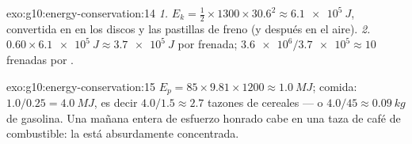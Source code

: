 \begin{solution}{exo:g10:energy-conservation:14}
\emph{1.} $E_k = \tfrac12 \times 1300 \times 30.6^2 \approx
\qty{6.1e5}{J}$, convertida en  en los discos y las
pastillas de freno (y después en el aire).
\emph{2.} $0.60 \times \qty{6.1e5}{J} \approx \qty{3.7e5}{J}$ por
frenada; $\num{3.6e6}/\num{3.7e5} \approx 10$ frenadas por
.
\end{solution}

\begin{solution}{exo:g10:energy-conservation:15}
$E_p = 85 \times 9.81 \times 1200 \approx \qty{1.0}{MJ}$; comida:
$1.0/0.25 = \qty{4.0}{MJ}$, es decir $4.0/1.5 \approx 2.7$ tazones de
cereales --- o $4.0/45 \approx \qty{0.09}{kg}$ de gasolina. Una mañana
entera de esfuerzo honrado cabe en una taza de café de combustible: la
 está absurdamente concentrada.
\end{solution}

